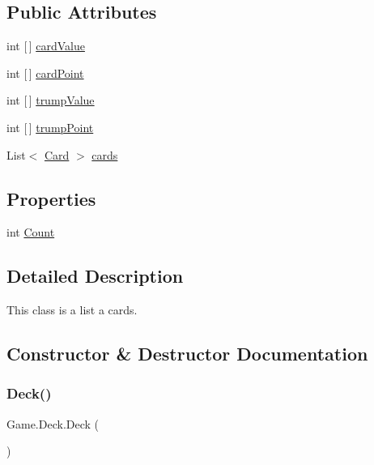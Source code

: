 \subsection*{Public Attributes}
\begin{DoxyCompactItemize}
\item 
int \mbox{[}$\,$\mbox{]} \hyperlink{class_game_1_1_deck_a65e61cbf0d765d09c6d0742792ec0d82}{card\+Value}
\item 
int \mbox{[}$\,$\mbox{]} \hyperlink{class_game_1_1_deck_a1250678654804b3aa2b272336467d739}{card\+Point}
\item 
int \mbox{[}$\,$\mbox{]} \hyperlink{class_game_1_1_deck_a1f9866a01494d663c631d26f5bb8aa59}{trump\+Value}
\item 
int \mbox{[}$\,$\mbox{]} \hyperlink{class_game_1_1_deck_a88e31656c1599ddbe6bfb62b2ca34442}{trump\+Point}
\item 
List$<$ \hyperlink{class_game_1_1_card}{Card} $>$ \hyperlink{class_game_1_1_deck_ab0baedb618b1ef893fa4ae9ce063748e}{cards}
\end{DoxyCompactItemize}
\subsection*{Properties}
\begin{DoxyCompactItemize}
\item 
int \hyperlink{class_game_1_1_deck_a9b8b9e6382eba67dfd83e41134c5a601}{Count}
\end{DoxyCompactItemize}


\subsection{Detailed Description}
This class is a list a cards. 

\subsection{Constructor \& Destructor Documentation}
\mbox{\label{class_game_1_1_deck_a977147d53a1be6b09363e38488937c14}} 
\subsubsection{\texorpdfstring{Deck()}{Deck()}}
{\footnotesize\ttfamily Game.\+Deck.\+Deck (\begin{DoxyParamCaption}{ }\end{DoxyParamCaption})\hspace{0.3cm}{\ttfamily [inline]}}

